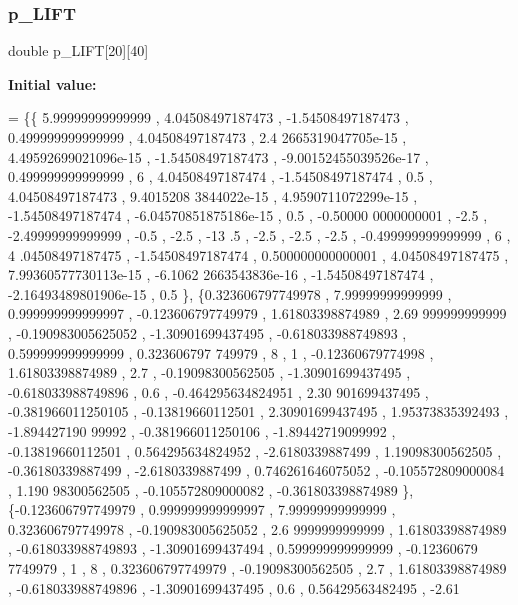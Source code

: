 \subsubsection{\texorpdfstring{p\+\_\+\+L\+I\+FT}{p\_LIFT}}
{\footnotesize\ttfamily double p\+\_\+\+L\+I\+FT\mbox{[}20\mbox{]}\mbox{[}40\mbox{]}}

{\bfseries Initial value\+:}
\begin{DoxyCode}
= \{\{ 5.99999999999999 ,  4.04508497187473 , -1.54508497187473 , 0.499999999999999 ,  4.04508497187473 , 2.4
      2665319047705e-15 , 4.49592699021096e-15 , -1.54508497187473 , -9.00152455039526e-17 , 0.499999999999999 ,  
                     6 ,  4.04508497187474 , -1.54508497187474 ,               0.5 ,  4.04508497187473 , 9.4015208
      3844022e-15 , 4.9590711072299e-15 , -1.54508497187474 , -6.04570851875186e-15 ,               0.5 , -0.50000
      0000000001 ,              -2.5 , -2.49999999999999 ,              -0.5 ,              -2.5 ,             -13
      .5 ,              -2.5 ,              -2.5 ,              -2.5 , -0.499999999999999 ,                 6 ,  4
      .04508497187475 , -1.54508497187474 , 0.500000000000001 ,  4.04508497187475 , 7.99360577730113e-15 , -6.1062
      2663543836e-16 , -1.54508497187474 , -2.16493489801906e-15 ,               0.5 \},
\{0.323606797749978 ,  7.99999999999999 , 0.999999999999997 , -0.123606797749979 ,  1.61803398874989 ,  2.69
      999999999999 , -0.190983005625052 , -1.30901699437495 , -0.618033988749893 , 0.599999999999999 , 0.323606797
      749979 ,                 8 ,                 1 , -0.12360679774998 ,  1.61803398874989 ,               2.7 ,
       -0.19098300562505 , -1.30901699437495 , -0.618033988749896 ,               0.6 , -0.464295634824951 ,  2.30
      901699437495 , -0.381966011250105 , -0.13819660112501 ,  2.30901699437495 ,  1.95373835392493 , -1.894427190
      99992 , -0.381966011250106 , -1.89442719099992 , -0.13819660112501 , 0.564295634824952 ,  -2.6180339887499 ,
        1.19098300562505 , -0.36180339887499 ,  -2.6180339887499 , 0.746261646075052 , -0.105572809000084 ,  1.190
      98300562505 , -0.105572809000082 , -0.361803398874989 \},
\{-0.123606797749979 , 0.999999999999997 ,  7.99999999999999 , 0.323606797749978 , -0.190983005625052 ,  2.6
      9999999999999 ,  1.61803398874989 , -0.618033988749893 , -1.30901699437494 , 0.599999999999999 , -0.12360679
      7749979 ,                 1 ,                 8 , 0.323606797749979 , -0.19098300562505 ,               2.7 
      ,  1.61803398874989 , -0.618033988749896 , -1.30901699437495 ,               0.6 ,  0.56429563482495 , -2.61

\end{DoxyCode}
